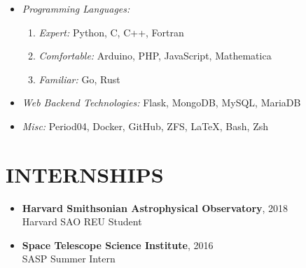 \documentclass[margin, 10pt]{res} %
\begin{document}
\begin{resume}
\begin{itemize}
\item {\sl Programming Languages:} 
    \begin{enumerate}
        \item{\sl Expert: } Python, C, C++, Fortran
        \item{\sl Comfortable: } Arduino, PHP, JavaScript, Mathematica
        \item{\sl Familiar: } Go, Rust 
    \end{enumerate}
\item {\sl Web Backend Technologies:} Flask, MongoDB, MySQL, MariaDB
\item {\sl Misc:} Period04, Docker, GitHub, ZFS, LaTeX, Bash, Zsh
\end{itemize}
 
\section{INTERNSHIPS}
\begin{itemize}
  \item \textbf{{\scriptsize Harvard Smithsonian Astrophysical Observatory}}, {\small 2018} \\Harvard SAO REU Student
  \item \textbf{{\scriptsize Space Telescope Science Institute}}, {\small 2016} \\SASP Summer Intern
\end{itemize}
 

\end{resume}
\end{document}
